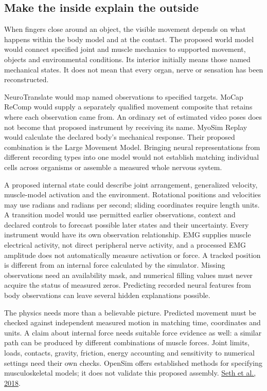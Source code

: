 \subsection{Make the inside explain the outside}

When fingers close around an object, the visible movement depends on what happens within the body model and at the contact. The proposed world model would connect specified joint and muscle mechanics to supported movement, objects and environmental conditions. Its interior initially means those named mechanical states. It does not mean that every organ, nerve or sensation has been reconstructed.

NeuroTranslate would map named observations to specified targets. MoCap ReComp would supply a separately qualified movement composite that retains where each observation came from. An ordinary set of estimated video poses does not become that proposed instrument by receiving its name. MyoSim Replay would calculate the declared body's mechanical response. Their proposed combination is the Large Movement Model. Bringing neural representations from different recording types into one model would not establish matching individual cells across organisms or assemble a measured whole nervous system.

A proposed internal state could describe joint arrangement, generalized velocity, muscle-model activation and the environment. Rotational positions and velocities may use radians and radians per second; sliding coordinates require length units. A transition model would use permitted earlier observations, context and declared controls to forecast possible later states and their uncertainty. Every instrument would have its own observation relationship. EMG supplies muscle electrical activity, not direct peripheral nerve activity, and a processed EMG amplitude does not automatically measure activation or force. A tracked position is different from an internal force calculated by the simulator. Missing observations need an availability mask, and numerical filling values must never acquire the status of measured zeros. Predicting recorded neural features from body observations can leave several hidden explanations possible.

The physics needs more than a believable picture. Predicted movement must be checked against independent measured motion in matching time, coordinates and units. A claim about internal force needs suitable force evidence as well: a similar path can be produced by different combinations of muscle forces. Joint limits, loads, contacts, gravity, friction, energy accounting and sensitivity to numerical settings need their own checks. OpenSim offers established methods for specifying musculoskeletal models; it does not validate this proposed assembly. \href{https://journals.plos.org/ploscompbiol/article?id=10.1371/journal.pcbi.1006223}{Seth et al., 2018}.

